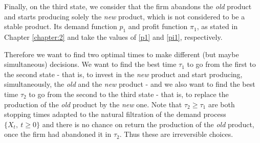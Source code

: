 








Finally, on the third state, we consider that the firm abandons the \textit{old} product and starts producing solely the \textit{new} product, which is not considered to be a stable product. Its demand function $p_1$ and profit function $\pi_1$, as stated in Chapter \ref{chapter:2} and take the values of \eqref{p1} and \eqref{pi1}, respectively.


Therefore we want to find two optimal times to make different (but maybe simultaneous) decisions. We want to find the best time $\tau_1$ to go from the first to the second state - that is, to invest in the \textit{new} product and start producing, simultaneously, the \textit{old} and the \textit{new} product - and we also want to find the best time $\tau_2$ to go from the second to the third state - that is, to replace the production of the \textit{old} product by the \textit{new} one. Note that $\tau_2 \geq \tau_1$ are both stopping times adapted to the natural filtration of the demand process $\{ X_t, \ t\geq0 \}$ and there is no chance on return the production of the \textit{old} product, once the firm had abandoned it in $\tau_2$. Thus these are irreversible choices. 

